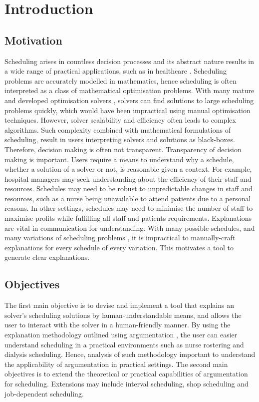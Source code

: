 \chapter{Introduction}
	
\section{Motivation}

Scheduling arises in countless decision processes and its abstract nature results in a wide range of practical applications, such as in healthcare \cite{sanr}. Scheduling problems are accurately modelled in mathematics, hence scheduling is often interpreted as a class of mathematical optimisation problems. With many mature and developed optimisation solvers \cite{clp}, solvers can find solutions to large scheduling problems quickly, which would have been impractical using manual optimisation techniques. However, solver scalability and efficiency often leads to complex algorithms. Such complexity combined with mathematical formulations of scheduling, result in users interpreting solvers and solutions as black-boxes. Therefore, decision making is often not transparent.
\linespace
Transparency of decision making is important. Users require a means to understand why a schedule, whether a solution of a solver or not, is reasonable given a context. For example, hospital managers may seek understanding about the efficiency of their staff and resources. Schedules may need to be robust to unpredictable changes in staff and resources, such as a nurse being unavailable to attend patients due to a personal reasons. In other settings, schedules may need to minimise the number of staff to maximise profits while fulfilling all staff and patients requirements.
\linespace
Explanations are vital in communication for understanding. With many possible schedules, and many variations of scheduling problems \cite{sta}, it is impractical to manually-craft explanations for every schedule of every variation. This motivates a tool to generate clear explanations.

\section{Objectives}

The first main objective is to devise and implement a tool that explains an solver's scheduling solutions by human-understandable means, and allows the user to interact with the solver in a human-friendly manner. By using the explanation methodology outlined using argumentation \cite{aes}, the user can easier understand scheduling in a practical environments such as nurse rostering and dialysis scheduling. Hence, analysis of such methodology important to understand the applicability of argumentation in practical settings.
\linespace
The second main objectives is to extend the theoretical or practical capabilities of argumentation for scheduling. Extensions may include interval scheduling, shop scheduling and job-dependent scheduling.

